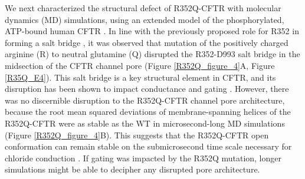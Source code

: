 We next characterized the structural defect of R352Q-CFTR with molecular dynamics (MD) simulations, using an extended model of the phosphorylated, ATP-bound human CFTR \cite{wong2022}. In line with the previously proposed role for R352 in forming a salt bridge \cite{cui2008}, it was observed that mutation of the positively charged arginine (R) to neutral glutamine (Q) disrupted the R352-D993 salt bridge in the midsection of the CFTR channel pore (Figure \ref{R352Q_figure_4}A, Figure \ref{R35Q_E4}). This salt bridge is a key structural element in CFTR, and its disruption has been shown to impact conductance and gating \cite{cui2008}. However, there was no discernible disruption to the R352Q-CFTR channel pore architecture, because the root mean squared deviations of membrane-spanning helices of the R352Q-CFTR were as stable as the WT in microsecond-long MD simulations (Figure \ref{R352Q_figure_4}B). This suggests that the R352Q-CFTR open conformation can remain stable on the submicrosecond time scale necessary for chloride conduction \cite{sorum2015}. If gating was impacted by the R352Q mutation, longer simulations might be able to decipher any disrupted pore architecture.

